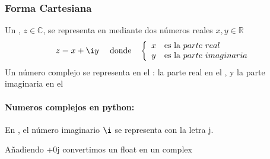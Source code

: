 \documentclass[letterpaper,10pt,english]{jupyterBook}
\begin{document}
\subsubsection{Forma Cartesiana}
\label{\detokenize{docs/Part_01_Formalismo/Chapter_01_02_Formalismo_matem_xe1tico/01_01_Numeros_Complejos_myst:forma-cartesiana}}
\sphinxAtStartPar
Un , \(z \in {\mathbb C}\), se representa en   mediante dos
números reales \(x,y\in {\mathbb R}\)
\begin{equation*}
\begin{split}
z = x + \i y   ~~~~ \hbox{donde}~~~ 
\left\{\begin{array}{cl} x &\hbox{es la }   parte~ real\\
y & \hbox{es la } parte~imaginaria
\end{array}
\right.
\end{split}
\end{equation*}
\sphinxAtStartPar
Un número complejo se representa  en el : la parte real  en el , y la parte imaginaria  en el 


\paragraph{Numeros complejos en python:}
\label{\detokenize{docs/Part_01_Formalismo/Chapter_01_02_Formalismo_matem_xe1tico/01_01_Numeros_Complejos_myst:numeros-complejos-en-python}}
\sphinxAtStartPar
En , el número  imaginario \(\i\) se representa con la letra j.

\sphinxAtStartPar
Añadiendo +0j convertimos un float en un complex
\end{document}
